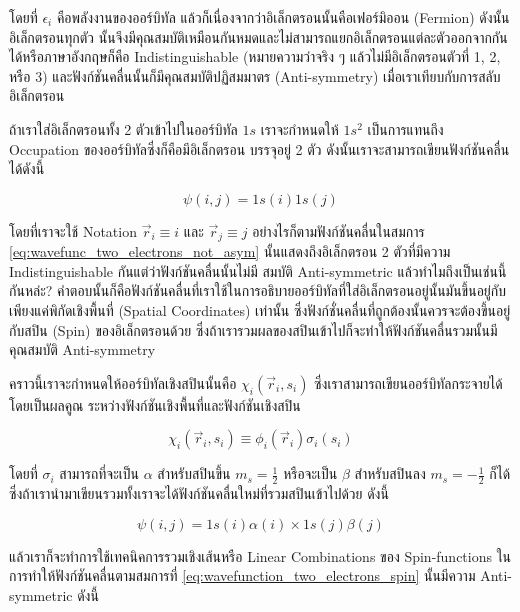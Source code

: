 \noindent โดยที่ $\epsilon_{i}$ คือพลังงานของออร์บิทัล แล้วก็เนื่องจากว่าอิเล็กตรอนนั้นคือเฟอร์มิออน (Fermion) ดังนั้นอิเล็กตรอนทุกตัว%
นั้นจึงมีคุณสมบัติเหมือนกันหมดและไม่สามารถแยกอิเล็กตรอนแต่ละตัวออกจากกันได้หรือภาษาอังกฤษก็คือ Indistinguishable 
(หมายความว่าจริง ๆ แล้วไม่มีอิเล็กตรอนตัวที่ 1, 2, หรือ 3) และฟังก์ชันคลื่นนั้นก็มีคุณสมบัติปฏิสมมาตร (Anti-symmetry) เมื่อเราเทียบกับการสลับอิเล็กตรอน

ถ้าเราใส่อิเล็กตรอนทั้ง 2 ตัวเข้าไปในออร์บิทัล $1s$ เราจะกำหนดให้ $1 s^2$ เป็นการแทนถึง Occupation ของออร์บิทัลซึ่งก็คือมีอิเล็กตรอน%
บรรจุอยู่ 2 ตัว ดังนั้นเราจะสามารถเขียนฟังก์ชันคลื่นได้ดังนี้

\begin{equation}
    \label{eq:wavefunc_two_electrons_not_asym}
    \psi(i, j) = 1 s(i) 1 s(j)
\end{equation}

\noindent โดยที่เราจะใช้ Notation $\vec{r}_i \equiv i$ และ $\vec{r}_j \equiv j$ อย่างไรก็ตามฟังก์ชันคลื่นในสมการ 
\ref{eq:wavefunc_two_electrons_not_asym} นั้นแสดงถึงอิเล็กตรอน 2 ตัวที่มีความ Indistinguishable กันแต่ว่าฟังก์ชันคลื่นนั้นไม่มี%
สมบัติ Anti-symmetric แล้วทำไมถึงเป็นเช่นนี้กันหล่ะ? คำตอบนั้นก็คือฟังก์ชันคลื่นที่เราใช้ในการอธิบายออร์บิทัลที่ใส่อิเล็กตรอนอยู่นั้นมันขึ้นอยู่กับ%
เพียงแค่พิกัดเชิงพื้นที่ (Spatial Coordinates) เท่านั้น ซึ่งฟังก์ชั่นคลื่นที่ถูกต้องนั้นควรจะต้องขึ้นอยู่กับสปิน (Spin) ของอิเล็กตรอนด้วย%
ซึ่งถ้าเรารวมผลของสปินเข้าไปก็จะทำให้ฟังก์ชันคลื่นรวมนั้นมีคุณสมบัติ Anti-symmetry 

คราวนี้เราจะกำหนดให้ออร์บิทัลเชิงสปินนั้นคือ $\chi_i\left(\vec{r}_i, s_i\right)$ ซึ่งเราสามารถเขียนออร์บิทัลกระจายได้โดยเป็นผลคูณ%
ระหว่างฟังก์ชันเชิงพื้นที่และฟังก์ชันเชิงสปิน

\begin{equation}
    \chi_i\left(\vec{r}_i, s_i\right) 
    \equiv 
    \phi_i\left(\vec{r}_i\right) \sigma_i\left(s_i\right)
\end{equation}

\noindent โดยที่ $\sigma_i$ สามารถที่จะเป็น $\alpha$ สำหรับสปินขึ้น $m_s=\frac{1}{2}$ หรือจะเป็น $\beta$ สำหรับสปินลง 
$m_s=-\frac{1}{2}$ ก็ได้ ซึ่งถ้าเรานำมาเขียนรวมทั้งเราจะได้ฟังก์ชันคลื่นใหม่ที่รวมสปินเข้าไปด้วย ดังนี้

\begin{equation}
    \label{eq:wavefunction_two_electrons_spin}
    \psi(i, j) = 1 s(i) \alpha(i) \times 1 s(j) \beta(j)
\end{equation}

\noindent แล้วเราก็จะทำการใช้เทคนิคการรวมเชิงเส้นหรือ Linear Combinations ของ Spin-functions ในการทำให้ฟังก์ชันคลื่นตามสมการที่ 
\ref{eq:wavefunction_two_electrons_spin} นั้นมีความ Anti-symmetric ดังนี้

